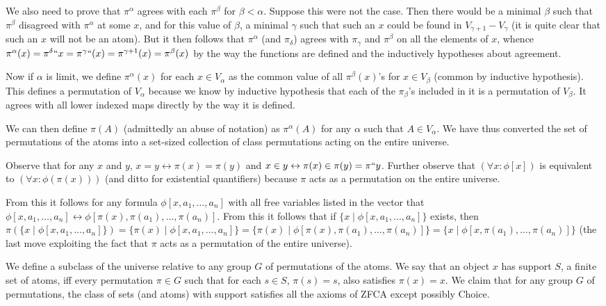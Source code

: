 \documentclass[12pt]{book}
\begin{document}
 We also need to prove that $\pi^{\alpha}$ agrees with each $\pi^{\beta}$ for $\beta<\alpha$.  Suppose this were not the case.  Then there would be a minimal $\beta$ such that
$\pi^{\beta}$ disagreed with $\pi^{\alpha}$ at some $x$, and for this value of $\beta$, a minimal $\gamma$ such that such an $x$ could be found in $V_{\gamma+1} - V_{\gamma}$ (it is quite clear that such an $x$ will not be an atom).  But it then follows that $\pi^{\alpha}$ (and $\pi_{\delta}$)  agrees with $\pi_{\gamma}$ and $\pi^{\beta}$ on all the elements of $x$, whence $\pi^{\alpha}(x) = \pi^{\delta}``x = \pi^{\gamma}``(x) = \pi^{\gamma+1}(x) = \pi^{\beta}(x)$ by the way the functions are defined and the inductively hypotheses about agreement.

Now if $\alpha$ is limit, we define $\pi^{\alpha}(x)$ for each $x \in V_{\alpha}$ as the common value of all $\pi^{\beta}(x)$'s for $x \in V_{\beta}$ (common by inductive hypothesis).
This defines a permutation of $V_{\alpha}$ because we know by inductive hypothesis that each of the $\pi_{\beta}$'s included in it is a permutation of $V_{\beta}$.  It agrees with all lower indexed maps directly by the way it is defined.

We can then define $\pi(A)$ (admittedly an abuse of notation) as $\pi^{\alpha}(A)$ for any $\alpha$ such that $A \in V_{\alpha}$.  We have thus converted the set of permutations
of the atoms into a set-sized collection of class permutations acting on the entire universe.

Observe that for any $x$ and $y$, $x = y \leftrightarrow \pi(x)=\pi(y)$ and $x \in y \leftrightarrow \pi(x) \in \pi(y) = \pi``y$.  Further observe that $(\forall x:\phi[x])$ is equivalent to $(\forall x:\phi(\pi(x)))$ (and ditto for existential quantifiers) because $\pi$ acts as a permutation on the entire universe.

From this it follows for any formula $\phi[x,a_1,\ldots,a_n]$ with all free variables listed in the vector that  $\phi[x,a_1,\ldots,a_n] \leftrightarrow \phi[\pi(x),\pi(a_1),\ldots,\pi(a_n)]$.
From this it follows that if $\{x \mid \phi[x,a_1,\ldots,a_n]\}$ exists, then $\pi(\{x \mid \phi[x,a_1,\ldots,a_n]\}) = \{\pi(x) \mid \phi[x,a_1,\ldots,a_n]\} = \{\pi(x) \mid \phi[\pi(x),\pi(a_1),\ldots,\pi(a_n)]\} = \{x \mid \phi[x,\pi(a_1),\ldots,\pi(a_n)]\}$ (the last move exploiting the fact that $\pi$ acts as a permutation of the entire universe).

We define a subclass of the universe relative to any group $G$ of permutations of the atoms.  We say that an object $x$ has support $S$, a finite set of atoms, iff every permutation $\pi \in G$ such that for each $s \in S$, $\pi(s)=s$, also satisfies $\pi(x) =x$.  We claim that for any group $G$ of permutations, the class of sets (and atoms) with support satisfies all the axioms of ZFCA except possibly Choice.
\end{document}
